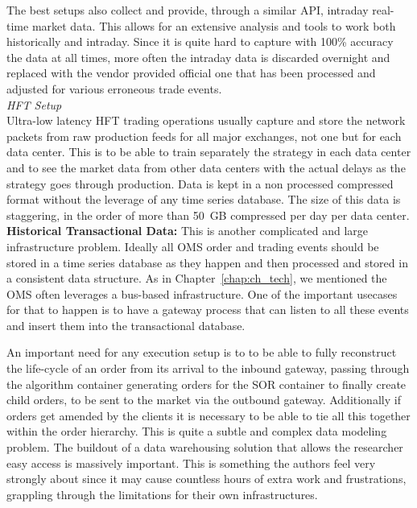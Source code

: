 The best setups also collect and provide, through a similar API, intraday real-time market data. This allows for an extensive analysis and tools to work both historically and intraday. Since it is quite hard to capture with 100\% accuracy the data at all times, more often the intraday data is discarded overnight and replaced with the vendor provided official one that has been processed and adjusted for various erroneous trade events. \\


\noindent\emph{HFT Setup} \\


Ultra-low latency HFT trading operations usually capture and store the network packets from raw production feeds for all major exchanges, not one but for each data center. This is to be able to train separately the strategy in each data center and to see the market data from other data centers with the actual delays as the strategy goes through production. Data is kept in a non processed compressed format without the leverage of any time series database. The size of this data is staggering, in the order of more than 50~GB compressed per day per data center. \\


\noindent\textbf{Historical Transactional Data:} This is another complicated and large infrastructure problem. Ideally all OMS order and trading events should be stored in a time series database as they happen and then processed and stored in a consistent data structure. As in Chapter~\ref{chap:ch_tech}, we mentioned the OMS often leverages a bus-based infrastructure. One of the important usecases for that to happen is to have a gateway process that can listen to all these events and insert them into the transactional database.


An important need for any execution setup is to to be able to fully reconstruct the life-cycle of an order from its arrival to the inbound gateway, passing through the algorithm container generating orders for the SOR container to finally create child orders, to be sent to the market via the outbound gateway. Additionally if orders get amended by the clients it is necessary to be able to tie all this together within the order hierarchy. This is quite a subtle and complex data modeling problem. The buildout of a data warehousing solution that allows the researcher easy access is massively important. This is something the authors feel very strongly about since it may cause countless hours of extra work and frustrations, grappling through the limitations for their own infrastructures.


